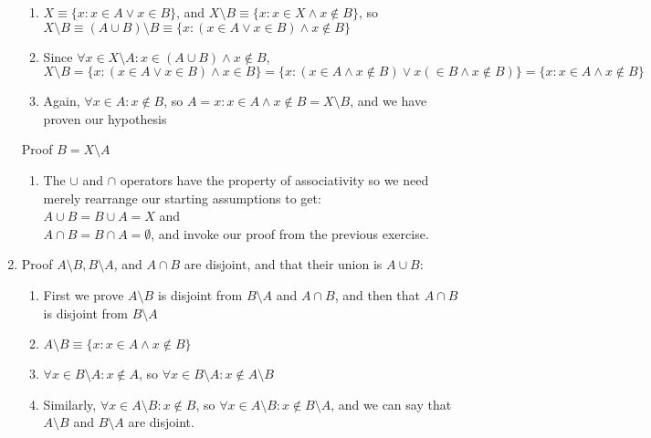 \documentclass{article}
\begin{document}
\begin{enumerate}
\begin{enumerate}
                \item $X \equiv \{x : x \in A \lor x \in B\}$, and $X \setminus B \equiv \{x : x \in X \land x \notin B\}$, so
                    $X \setminus B \equiv (A \cup B) \setminus B \equiv \{x : (x \in A \lor x \in B) \land x \notin B\}$
                \item Since $\forall x \in X \setminus A: x \in (A \cup B) \land x
                    \notin B$, $X \setminus B = \{x : (x \in A \lor x \in B) \land x \in
                    B\} = \{x: (x \in A \land x \notin B) \lor x (\in B \land x
                    \notin B)\} = \{x: x \in A \land x \notin B\}$
                \item Again, $\forall x \in A: x \notin B$, so $A = {x: x \in A \land x \notin B} = X \setminus B$,
                    and we have proven our hypothesis
            \end{enumerate}
            Proof $B = X \setminus A$
            \begin{enumerate}
                \item The $\cup$ and $\cap$ operators have the property of associativity so we need merely rearrange our
                    starting assumptions to get: \\
                    $A \cup B = B \cup A = X$ and \\
                    $A \cap B = B \cap A = \emptyset$, and invoke our proof from the previous exercise.
            \end{enumerate}
        \item Proof $A \setminus B, B \setminus A$, and $A \cap B$ are disjoint, and that their union is $A \cup B$:
            \begin{enumerate}
                \item First we prove $A \setminus B$ is disjoint from $B
                    \setminus A$ and $A \cap B$, and then that $A \cap B$ is
                    disjoint from $B \setminus A$
                \item $A \setminus B \equiv \{x : x \in A \land x \notin B\}$
                \item $\forall x \in B \setminus A: x \notin A$, so $\forall x
                    \in B \setminus A: x \notin A \setminus B$
                \item Similarly, $\forall x \in A \setminus B: x \notin B$, so
                    $\forall x \in A \setminus B: x \notin B \setminus A$, and
                    we can say that $A \setminus B$ and $B \setminus A$ are
                    disjoint.

\end{enumerate}
\end{enumerate}
\end{document}

